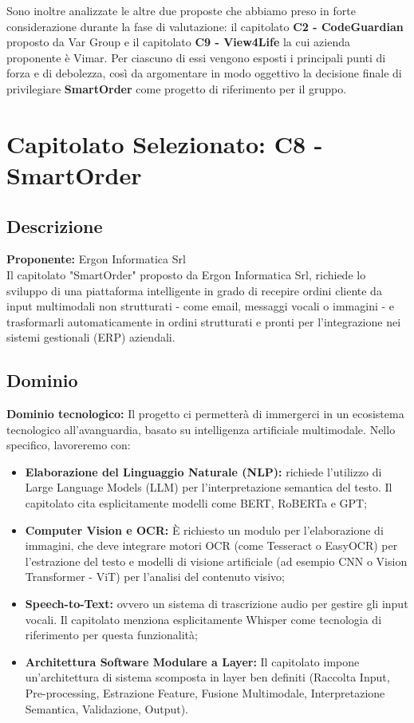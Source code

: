 \documentclass{article}
\begin{document}
	Sono inoltre analizzate le altre due proposte che abbiamo preso in forte considerazione durante la fase di valutazione: il capitolato \textbf{C2 - CodeGuardian} proposto da Var Group e il capitolato \textbf{C9 - View4Life} la cui azienda proponente è Vimar. Per ciascuno di essi vengono esposti i principali punti di forza e di debolezza, così da argomentare in modo oggettivo la decisione finale di privilegiare \textbf{SmartOrder} come progetto di riferimento per il gruppo.
	
	\section{Capitolato Selezionato: C8 - SmartOrder}
	\subsection{Descrizione}
    \textbf{Proponente:} Ergon Informatica Srl\\
	Il capitolato "SmartOrder" proposto da Ergon Informatica Srl, richiede lo sviluppo di una piattaforma intelligente in grado di recepire ordini cliente da input multimodali non strutturati - come email, messaggi vocali o immagini - e trasformarli automaticamente in ordini strutturati e pronti per l'integrazione nei sistemi gestionali (ERP) aziendali.
	
	\subsection{Dominio}
	\textbf{Dominio tecnologico:} 
          Il progetto ci permetterà di immergerci in un ecosistema tecnologico all'avanguardia, basato su intelligenza artificiale multimodale. Nello specifico, lavoreremo con:
	\vspace{-0.3em}
	\begin{itemize}
	    \setlength\itemsep{-0.1em}
	    \item \textbf{Elaborazione del Linguaggio Naturale (NLP):} richiede l'utilizzo di Large Language Models (LLM) per l'interpretazione semantica del testo. Il capitolato cita esplicitamente modelli come BERT, RoBERTa e GPT;
	    \item \textbf{Computer Vision e OCR:} È richiesto un modulo per l'elaborazione di immagini, che deve integrare motori OCR (come Tesseract o EasyOCR) per l'estrazione del testo e modelli di visione artificiale (ad esempio CNN o Vision Transformer - ViT) per l'analisi del contenuto visivo;
	    \item \textbf{Speech-to-Text:} ovvero un sistema di trascrizione audio per gestire gli input vocali. Il capitolato menziona esplicitamente Whisper come tecnologia di riferimento per questa funzionalità;
	    \item \textbf{Architettura Software Modulare a Layer:} Il capitolato impone un'architettura di sistema scomposta in layer ben definiti (Raccolta Input, Pre-processing, Estrazione Feature, Fusione Multimodale, Interpretazione Semantica, Validazione, Output).
	\end{itemize}
    
\end{document}
